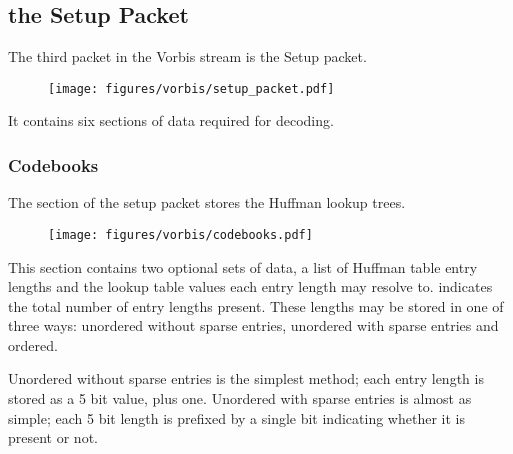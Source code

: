 \subsection{the Setup Packet}

The third packet in the Vorbis stream is the Setup packet.

\begin{figure}[h]
\texttt{[image: figures/vorbis/setup\_packet.pdf]}
\end{figure}

It contains six sections of data required for decoding.

\clearpage

\subsubsection{Codebooks}

The  section of the setup packet stores
the Huffman lookup trees.

\begin{figure}[h]
\texttt{[image: figures/vorbis/codebooks.pdf]}
\end{figure}
\par
\noindent
This section contains two optional sets of data,
a list of Huffman table entry lengths
and the lookup table values each entry length may resolve to.
 indicates the total number of entry lengths present.
These lengths may be stored in one of three ways:
unordered without sparse entries, unordered with sparse entries
and ordered.

Unordered without sparse entries is the simplest method;
each entry length is stored as a 5 bit value, plus one.
Unordered with sparse entries is almost as simple;
each 5 bit length is prefixed by a single bit indicating
whether it is present or not.


